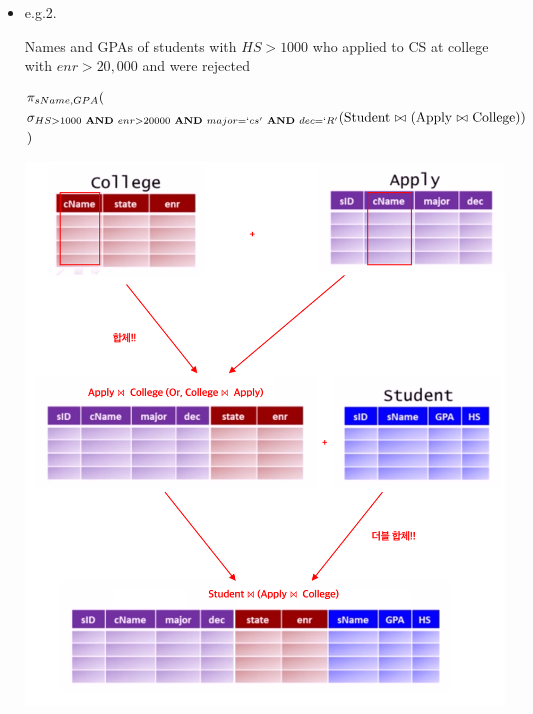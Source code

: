 \documentclass[12pt]{article}
\begin{document}
\begin{enumerate}
\begin{enumerate}[a)]
\begin{itemize}
\begin{itemize}
                \item e.g.2.

                \bigskip

                Names and GPAs of students with $HS > 1000$ who applied to CS
                at college with $enr > 20,000$ and were rejected

                \bigskip

                \begin{align*}
                    \begin{split}
                        &\pi_{sName,GPA} (\\
                        &\sigma_{HS > 1000 \textbf{ AND } enr > 20000 \textbf{ AND } major = `cs' \textbf{ AND } dec = `R'}\text{(Student $\bowtie$ (Apply $\bowtie$ College))}\\
                        &)
                    \end{split}
                \end{align*}

                \begin{center}
                \includegraphics[width=\linewidth]{images/worksheet_2_solution_6.png}
                \end{center}


\end{itemize}
\end{itemize}
\end{enumerate}
\end{enumerate}
\end{document}
